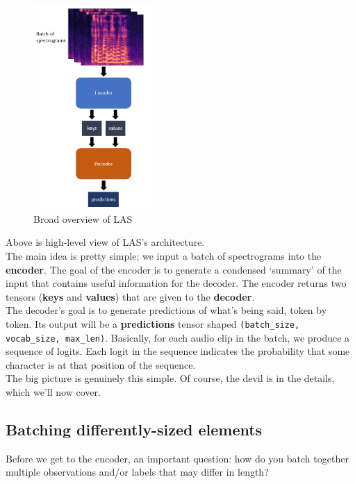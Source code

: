 \documentclass{article}
\newcommand{\ttt}[1]{\texttt{#1}}
\begin{document}
\begin{figure}[h]
\centering
\includegraphics[width=0.4\textwidth]{images/pipeline.png}
\caption{Broad overview of LAS}
\end{figure}

Above is high-level view of LAS's architecture. \\

The main idea is pretty simple; we input a batch of spectrograms into the \textbf{encoder}. The goal of the encoder is to generate a condensed `summary' of the input that contains useful information for the decoder. The encoder returns two tensors (\textbf{keys} and \textbf{values}) that are given to the \textbf{decoder}. \\

The decoder's goal is to generate predictions of what's being said, token by token. Its output will be a \textbf{predictions} tensor shaped \ttt{(batch\_size, vocab\_size, max\_len)}. Basically, for each audio clip in the batch, we produce a sequence of logits. Each logit in the sequence indicates the probability that some character is at that position of the sequence. \\

The big picture is genuinely this simple. Of course, the devil is in the details, which we'll now cover.


\subsection{Batching differently-sized elements}

Before we get to the encoder, an important question: how do you batch together multiple observations and/or labels that may differ in length? \\
\end{document}
